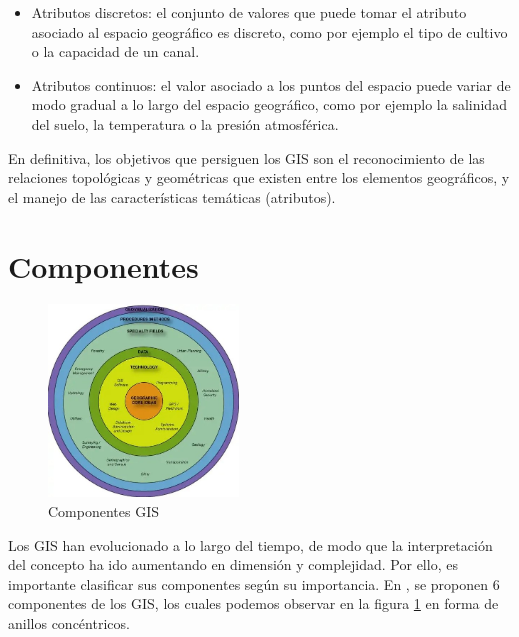 \begin{itemize}
  \item Atributos discretos: el conjunto de valores que puede tomar el atributo asociado al espacio geográfico es discreto,
  como por ejemplo el tipo de cultivo o la capacidad de un canal.
  \item Atributos continuos: el valor asociado a los puntos del espacio puede variar de modo gradual a lo largo del espacio geográfico,
  como por ejemplo la salinidad del suelo, la temperatura o la presión atmosférica.
\end{itemize}

En definitiva, los objetivos que persiguen los GIS son el reconocimiento de las relaciones topológicas y geométricas que existen entre los elementos geográficos, 
y el manejo de las características temáticas (atributos).

\section{Componentes}

\begin{figure}[H]
  \centering
  \includegraphics[width=0.45\textwidth]{Imagenes/GIS/Componentes-GIS.jpg}
  \caption{Componentes GIS} \label{fig:compnentesGIS}
\end{figure}

Los GIS han evolucionado a lo largo del tiempo, de modo que la interpretación del concepto ha ido aumentando en dimensión y complejidad. 
Por ello, es importante clasificar sus componentes según su importancia. En \cite{components-GIS}, se proponen 6 componentes de los GIS, 
los cuales podemos observar en la figura \ref{fig:compnentesGIS} en forma de anillos concéntricos.

